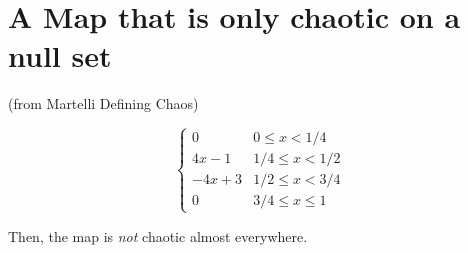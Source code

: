 \documentclass[11pt]{book}
\begin{document}
\section{A Map that is only chaotic on a null set}
(from Martelli Defining Chaos)
 
\begin{equation*}
  \begin{cases}
    0 &0\leq x < 1/4 \\
    4x - 1 &1/4 \leq x < 1/2 \\
    -4x + 3 &1/2 \leq x < 3/4 \\
    0 &3/4 \leq x \leq 1
  \end{cases}
\end{equation*}

Then, the map is \textit{not} chaotic almost everywhere.



\end{document}
